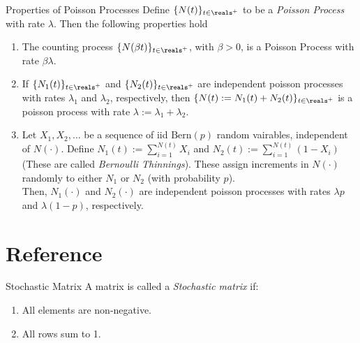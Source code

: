 \documentclass[11pt,a4paper]{article}
\begin{document}
\begin{proposition}{Properties of Poisson Processes}
  Define $\{N(t)\}_{t\in\reals^+}$ to be a \textit{Poisson Process} with rate $\lambda$. Then the following properties hold
  \begin{enumerate}
    \item The counting process $\{N(\beta t)\}_{t\in\reals^+}$, with $\beta>0$, is a Poisson Process with rate $\beta\lambda$.
    \item If $\{N_1(t)\}_{t\in\reals^+}$ and $\{N_2(t)\}_{t\in\reals^+}$ are independent poisson processes with rates $\lambda_1$ and $\lambda_2$, respectively, then $\{N(t):=N_1(t)+N_2(t)\}_{t\in\reals^+}$ is a poisson process with rate $\lambda:=\lambda_1+\lambda_2$.
    \item Let $X_1,X_2,\dots$ be a sequence of iid $\text{Bern}(p)$ random vairables, independent of $N(\cdot)$. Define $N_1(t):=\sum_{i=1}^{N(t)}X_i$ and $N_2(t):=\sum_{i=1}^{N(t)}(1-X_i)$ (These are called \textit{Bernoulli Thinnings}). These assign increments in $N(\cdot)$ randomly to either $N_1$ or $N_2$ (with probability $p$).\\
    Then, $N_1(\cdot)$ and $N_2(\cdot)$ are independent poisson processes with rates $\lambda p$ and $\lambda(1-p)$, respectively.
  \end{enumerate}
\end{proposition}

\setcounter{section}{-1}
\section{Reference}

\begin{definition}{Stochastic Matrix}
  A matrix is called a \textit{Stochastic matrix} if:
  \begin{enumerate}
    \item All elements are non-negative.
    \item All rows sum to 1.
  \end{enumerate}
\end{definition}
\end{document}
